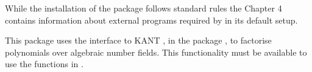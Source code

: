 While the installation of the package follows standard {\GAP} rules
the Chapter 4 contains information about external programs required by
{\Radiroot} in its default setup.


This package uses the interface to KANT \cite{KANT}, in the package \Alnuth, to
factorise polynomials over algebraic number fields. This functionality must
be available to use the functions in {\Radiroot}.  


